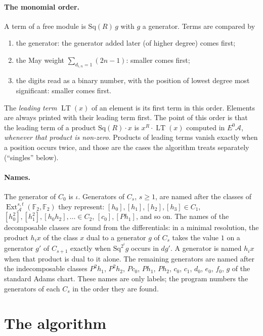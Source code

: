 \documentclass[11pt]{article}
\newcommand{\Sq}{\mathrm{Sq}}
\newcommand{\F}{\mathbb{F}_2}
\newcommand{\A}{\mathcal{A}}
\DeclareMathOperator{\LT}{LT}
\DeclareMathOperator{\Ext}{Ext}
\begin{document}
\paragraph{The monomial order.}
A term of a free module is $\Sq(R)\,g$ with $g$ a generator. Terms are compared by
\begin{enumerate}
\item the generator: the generator added later (of higher degree) comes first;
\item the May weight $\sum_{d_{i,n} = 1} (2n - 1)$: smaller comes first;
\item the digits read as a binary number, with the position of lowest degree most significant:
  smaller comes first.
\end{enumerate}
The \emph{leading term} $\LT(x)$ of an element is its first term in this order. Elements are
always printed with their leading term first. The point of this order is that the leading term
of a product $\Sq(R)\cdot x$ is $x^R \cdot \LT(x)$ computed in $E^0\A$, \emph{whenever that
product is non-zero}. Products of leading terms vanish exactly when a position occurs twice, and
those are the cases the algorithm treats separately (``singles'' below).

\paragraph{Names.}
The generator of $C_0$ is $\iota$. Generators of $C_s$, $s \ge 1$, are named after the classes of
$\Ext_\A^{s,t}(\F, \F)$ they represent: $[h_0], [h_1], [h_2], [h_3] \in C_1$, $[h_0^2], [h_1^2],
[h_0h_2], \dots \in C_2$, $[c_0], [Ph_1]$, and so on. The names of the decomposable classes are
found from the differentials: in a minimal resolution, the product $h_i x$ of the class $x$ dual to
a generator $g$ of $C_s$ takes the value $1$ on a generator $g'$ of $C_{s+1}$ exactly when
$\Sq^{2^i} g$ occurs in $d g'$. A generator is named $h_i x$ when that product is dual to it alone.
The remaining generators are named after the indecomposable classes $P^2h_1$, $P^2h_2$, $Pc_0$, $Ph_1$, $Ph_2$, $c_0$, $c_1$, $d_0$, $e_0$, $f_0$, $g$ of the standard Adams chart. These names are only labels; the program numbers the generators of
each $C_s$ in the order they are found.

\section{The algorithm}
\end{document}
